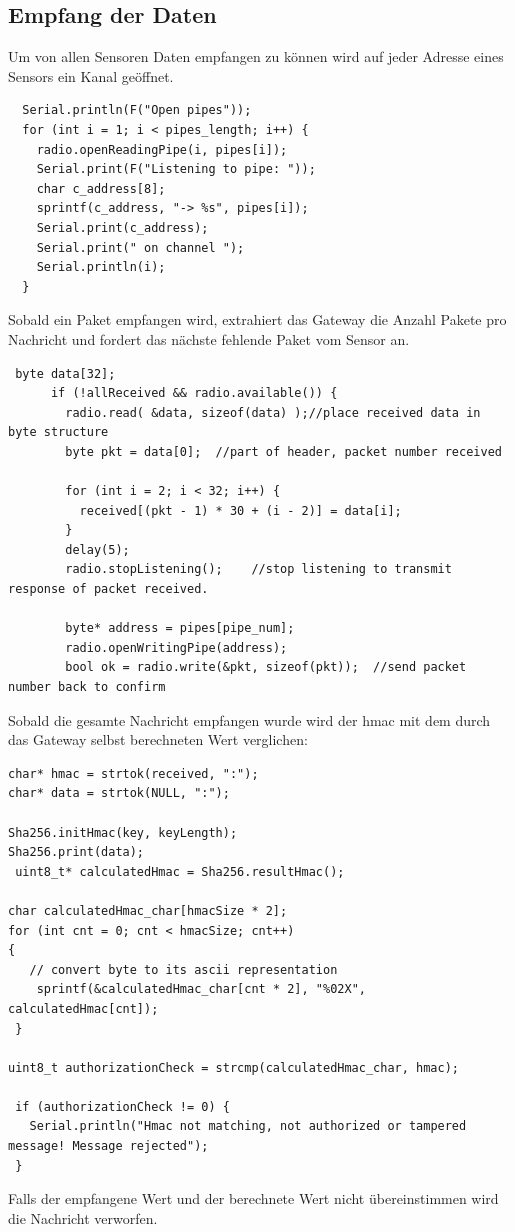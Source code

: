 \documentclass[
  12pt, %
  a4paper, %
  oneside, %
  openany, 
  numbers=noenddot, %
  BCOR=5mm, %
  parskip=half*, %
  thesis, %
]{bfhbook}
\begin{document}
 \subsection{Empfang der Daten}
 Um von allen Sensoren Daten empfangen zu können wird auf jeder Adresse eines Sensors ein Kanal geöffnet.
 \begin{verbatim}
  Serial.println(F("Open pipes"));
  for (int i = 1; i < pipes_length; i++) {
    radio.openReadingPipe(i, pipes[i]);
    Serial.print(F("Listening to pipe: "));
    char c_address[8];
    sprintf(c_address, "-> %s", pipes[i]);
    Serial.print(c_address);
    Serial.print(" on channel ");
    Serial.println(i);
  }
 \end{verbatim}
 Sobald ein Paket empfangen wird, extrahiert das Gateway die Anzahl Pakete pro Nachricht und fordert das nächste fehlende Paket vom Sensor an.
 \begin{verbatim}
 byte data[32];
      if (!allReceived && radio.available()) {
        radio.read( &data, sizeof(data) );//place received data in byte structure
        byte pkt = data[0];  //part of header, packet number received

        for (int i = 2; i < 32; i++) {
          received[(pkt - 1) * 30 + (i - 2)] = data[i];
        }
        delay(5);
        radio.stopListening();    //stop listening to transmit response of packet received.

        byte* address = pipes[pipe_num];
        radio.openWritingPipe(address);
        bool ok = radio.write(&pkt, sizeof(pkt));  //send packet number back to confirm
\end{verbatim}
Sobald die gesamte Nachricht empfangen wurde wird der \Gls{hmac} mit dem durch das Gateway selbst berechneten Wert verglichen:
\begin{verbatim}
char* hmac = strtok(received, ":");
char* data = strtok(NULL, ":");

Sha256.initHmac(key, keyLength);
Sha256.print(data);
 uint8_t* calculatedHmac = Sha256.resultHmac();

char calculatedHmac_char[hmacSize * 2];
for (int cnt = 0; cnt < hmacSize; cnt++)
{
   // convert byte to its ascii representation
    sprintf(&calculatedHmac_char[cnt * 2], "%02X", calculatedHmac[cnt]);
 }

uint8_t authorizationCheck = strcmp(calculatedHmac_char, hmac);

 if (authorizationCheck != 0) {
   Serial.println("Hmac not matching, not authorized or tampered message! Message rejected");
 }
\end{verbatim}
Falls der empfangene Wert und der berechnete Wert nicht übereinstimmen wird die Nachricht verworfen.
\end{document}
